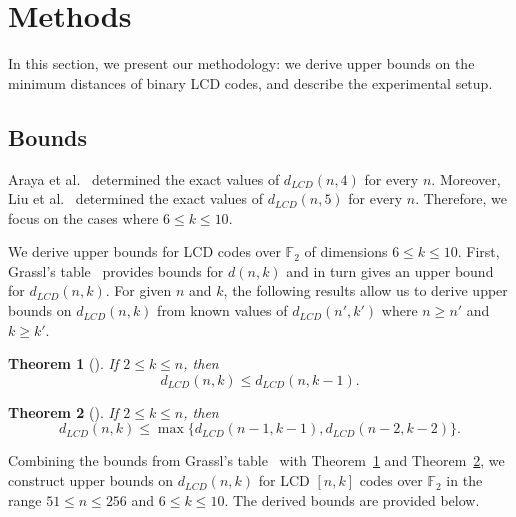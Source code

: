 \documentclass{article}
\newtheorem{theorem}{Theorem}[section]
\theoremstyle{definition}
\theoremstyle{remark}
\begin{document}
\section{Methods}
In this section, we present our methodology: we derive upper bounds on the minimum distances of binary LCD codes, and describe the experimental setup.

\subsection{Bounds}\label{experiments-bound-LCD}

Araya et al.~\cite{AHS-2021} determined the exact values of $d_{LCD}(n,4)$ for every $n$. Moreover, Liu et al.~\cite{LLFS-2024} determined the exact values of $d_{LCD}(n,5)$ for every $n$. Therefore, we focus on the cases where $6 \leq k\leq 10$.

We derive upper bounds for LCD codes over $\mathbb{F}_2$ of dimensions $6 \leq k \leq 10$. First, Grassl's table~\cite{grassl} provides bounds for $d(n,k)$ and in turn gives an upper bound for $d_{LCD}(n,k)$. For given $n$ and $k$, the following results allow us to derive upper bounds on $d_{LCD}(n,k)$ from known values of $d_{LCD}(n',k')$ where $n \geq n'$ and $k \geq k'$.
\begin{theorem}[\cite{CMTQ-2019}]\label{CMTQ-2019}
    If $2 \leq k \leq n$, then
    \[
    d_{LCD}(n,k) \leq d_{LCD}(n, k-1).
    \]
\end{theorem}

\begin{theorem}[\cite{LSL-2024}]\label{LCD-finite}
    If $2 \leq k \leq n$, then \[
    d_{LCD}(n,k) \leq \max \{d_{LCD}(n-1, k-1), d_{LCD}(n-2, k-2)\}.
    \]
\end{theorem}

Combining the bounds from Grassl's table~\cite{grassl} with Theorem~\ref{CMTQ-2019} and Theorem~\ref{LCD-finite}, we construct upper bounds on $d_{LCD}(n,k)$ for LCD $[n,k]$ codes over $\mathbb{F}_2$ in the range $51 \leq n \leq 256$ and $6 \leq k \leq 10$. The derived bounds are provided below.
\end{document}
